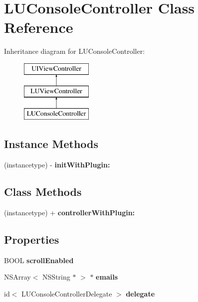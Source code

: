 \hypertarget{interface_l_u_console_controller}{}\section{L\+U\+Console\+Controller Class Reference}
\label{interface_l_u_console_controller}
Inheritance diagram for L\+U\+Console\+Controller\+:\begin{figure}[H]
\begin{center}
\leavevmode
\includegraphics[height=3.000000cm]{interface_l_u_console_controller}
\end{center}
\end{figure}
\subsection*{Instance Methods}
\begin{DoxyCompactItemize}
\item 
\mbox{\label{interface_l_u_console_controller_a0add05a28379cbf7d16b74b99c8eaa86}} 
(instancetype) -\/ {\bfseries init\+With\+Plugin\+:}
\end{DoxyCompactItemize}
\subsection*{Class Methods}
\begin{DoxyCompactItemize}
\item 
\mbox{\label{interface_l_u_console_controller_acd75740b7051d7e392ffa8de233c7204}} 
(instancetype) + {\bfseries controller\+With\+Plugin\+:}
\end{DoxyCompactItemize}
\subsection*{Properties}
\begin{DoxyCompactItemize}
\item 
\mbox{\label{interface_l_u_console_controller_ac83c65310bdfcb2850c0803a12bece4e}} 
B\+O\+OL {\bfseries scroll\+Enabled}
\item 
\mbox{\label{interface_l_u_console_controller_a46cb06bf76335ba1cc97eeb52c9a019a}} 
N\+S\+Array$<$ N\+S\+String $\ast$ $>$ $\ast$ {\bfseries emails}
\item 
\mbox{\label{interface_l_u_console_controller_ad400be32c17c0807b553c0ebb04a3ecd}} 
id$<$ L\+U\+Console\+Controller\+Delegate $>$ {\bfseries delegate}
\end{DoxyCompactItemize}


